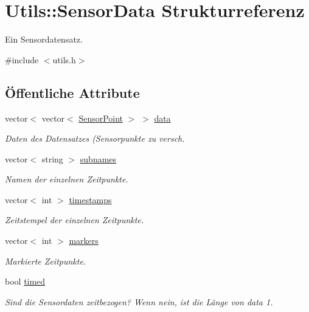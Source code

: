 \hypertarget{structUtils_1_1SensorData}{\section{Utils\-:\-:Sensor\-Data Strukturreferenz}
\label{structUtils_1_1SensorData}
}


Ein Sensordatensatz.  




{\ttfamily \#include $<$utils.\-h$>$}

\subsection*{Öffentliche Attribute}
\begin{DoxyCompactItemize}
\item 
vector$<$ vector$<$ \hyperlink{structUtils_1_1SensorPoint}{Sensor\-Point} $>$ $>$ \hyperlink{structUtils_1_1SensorData_ae94e7645dc0b6adfd21571b0abd5e309}{data}
\begin{DoxyCompactList}\small\item\em Daten des Datensatzes (Sensorpunkte zu versch. \end{DoxyCompactList}\item 
vector$<$ string $>$ \hyperlink{structUtils_1_1SensorData_ad5875ab7e8ebdc9dc41a7b9ef1c063ba}{subnames}
\begin{DoxyCompactList}\small\item\em Namen der einzelnen Zeitpunkte. \end{DoxyCompactList}\item 
vector$<$ int $>$ \hyperlink{structUtils_1_1SensorData_a654f9606c3ddc6e93afb86a116d11ea5}{timestamps}
\begin{DoxyCompactList}\small\item\em Zeitstempel der einzelnen Zeitpunkte. \end{DoxyCompactList}\item 
vector$<$ int $>$ \hyperlink{structUtils_1_1SensorData_ac2d7e037f39affd6ad9d4aa29ed579da}{markers}
\begin{DoxyCompactList}\small\item\em Markierte Zeitpunkte. \end{DoxyCompactList}\item 
bool \hyperlink{structUtils_1_1SensorData_aca94c3ec7e8f2e719f7cfcff4e9da41b}{timed}
\begin{DoxyCompactList}\small\item\em Sind die Sensordaten zeitbezogen? Wenn nein, ist die Länge von data 1. \end{DoxyCompactList}\item 

\end{DoxyCompactItemize}
